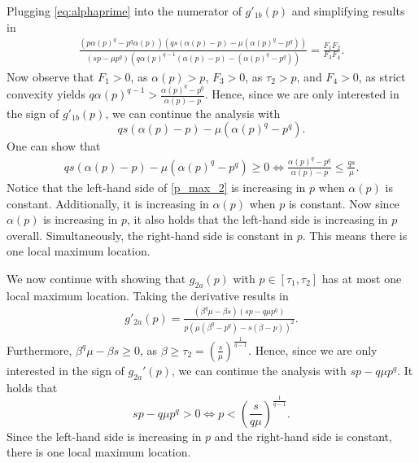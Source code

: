 \documentclass[11pt]{article}
\newcommand{\1}{\mathds{1}}
\begin{document}
\noindent Plugging \eqref{eq:alphaprime} into the numerator of $g'_{1b}(p)$ and simplifying results in 
\begin{align}
    \frac{\left(p \alpha(p)^{q} - p^{q} \alpha(p)\right) \left(qs \left(\alpha(p) - p\right)-\mu \left(\alpha(p)^{q} - p^{q}\right)\right)}{\left(sp-\mu p^{q}\right) \left(q \alpha(p)^{q-1} \left(\alpha(p) - p\right)- \left(\alpha(p)^{q} - p^{q}\right)\right)} = \frac{F_1F_2}{F_3F_4}.
\end{align}
\noindent Now observe that $F_1>0$, as $\alpha(p)>p$, $F_3>0$, as $\tau_2>p$, and $F_4>0$, as strict convexity yields $q\alpha(p)^{q-1} > \frac{\alpha(p)^q-p^q}{\alpha(p)-p}$. Hence, since we are only interested in the sign of $g'_{1b}(p)$, we can continue the analysis with $$qs \left(\alpha(p) - p\right)-\mu \left(\alpha(p)^{q} - p^{q}\right).$$
One can show that
\begin{align}\label{p_max_2}
qs \left(\alpha(p) - p\right)-\mu \left(\alpha(p)^{q} - p^{q}\right) \geq 0 \iff
\frac{\alpha(p)^q-p^q}{\alpha(p)-p}\leq \frac{qs}{\mu}.
\end{align}
Notice that the left-hand side of \eqref{p_max_2} is increasing in $p$ when $\alpha(p)$ is constant. Additionally, it is increasing in $\alpha(p)$ when $p$ is constant. Now since $\alpha(p)$ is increasing in $p$, it also holds that the left-hand side is increasing in $p$ overall. Simultaneously, the right-hand side is constant in $p$. This means there is one local maximum location.

We now continue with showing that $g_{2a}(p)$ with $p \in [\tau_1,\tau_2]$ has at most one local maximum location. Taking the derivative results in
\begin{align}
    g'_{2a}(p) = \frac{\left(\beta^{q} \mu - \beta s\right) \left(sp-q\mu p^{q}\right)}{p \left(\mu \left( \beta^{q}-p^q\right) - s \left( \beta-p\right)\right)^{2}}.
\end{align}
\noindent Furthermore, $\beta^q\mu - \beta s \geq 0$, as $\beta \geq \tau_2 = (\frac{s}{\mu})^{\frac{1}{q-1}}$. Hence, since we are only interested in the sign of $g_{2a}'(p)$, we can continue the analysis with $sp - q\mu p^q.$ It holds that
$$sp - q\mu p^q>0 \iff p < \left(\frac{s}{q\mu}\right)^{\frac{1}{q-1}}.$$
Since the left-hand side is increasing in $p$ and the right-hand side is constant, there is one local maximum location.
\end{document}
